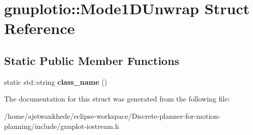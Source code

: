 \hypertarget{structgnuplotio_1_1Mode1DUnwrap}{}\section{gnuplotio\+:\+:Mode1\+D\+Unwrap Struct Reference}
\label{structgnuplotio_1_1Mode1DUnwrap}
\subsection*{Static Public Member Functions}
\begin{DoxyCompactItemize}
\item 
\mbox{\label{structgnuplotio_1_1Mode1DUnwrap_a2350096ad4d8b668f6df56c32cab69b6}} 
static std\+::string {\bfseries class\+\_\+name} ()
\end{DoxyCompactItemize}


The documentation for this struct was generated from the following file\+:\begin{DoxyCompactItemize}
\item 
/home/ajetwankhede/eclipse-\/workspace/\+Discrete-\/planner-\/for-\/motion-\/planning/include/gnuplot-\/iostream.\+h\end{DoxyCompactItemize}
